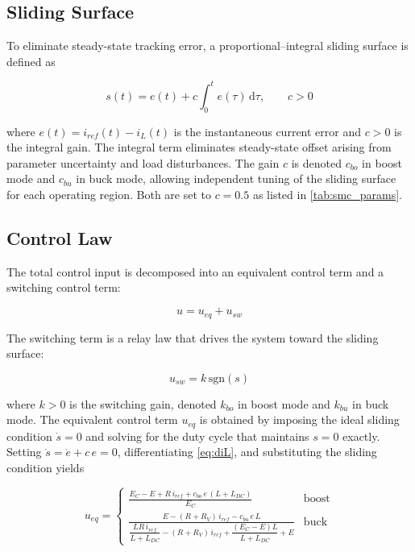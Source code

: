 \subsection{Sliding Surface}
\label{subsec:sliding_surface}

To eliminate steady-state tracking error, a proportional--integral
sliding surface is defined as

\begin{equation}
    s(t) = e(t) + c\int_0^t e(\tau)\,\mathrm{d}\tau, \qquad c > 0
    \label{eq:sliding_surface}
\end{equation}

where $e(t) = i_{ref}(t) - i_L(t)$ is the instantaneous current error
and $c > 0$ is the integral gain. The integral term eliminates
steady-state offset arising from parameter uncertainty and load
disturbances. The gain $c$ is denoted $c_{bo}$ in boost mode and
$c_{bu}$ in buck mode, allowing independent tuning of the sliding
surface for each operating region. Both are set to $c = 0.5$ as
listed in \cref{tab:smc_params}.

\subsection{Control Law}
\label{subsec:control_law}

The total control input is decomposed into an equivalent control term
and a switching control term:

\begin{equation}
    u = u_{eq} + u_{sw}
    \label{eq:control_law}
\end{equation}

The switching term is a relay law that drives the system toward the
sliding surface:

\begin{equation}
    u_{sw} = k\,\mathrm{sgn}(s)
    \label{eq:usw}
\end{equation}

where $k > 0$ is the switching gain, denoted $k_{bo}$ in boost mode
and $k_{bu}$ in buck mode. The equivalent control term $u_{eq}$
is obtained by imposing the ideal sliding condition $\dot{s} = 0$ and
solving for the duty cycle that maintains $s = 0$ exactly. Setting
$\dot{s} = \dot{e} + c\,e = 0$, differentiating \cref{eq:diL}, and
substituting the sliding condition yields

\begin{equation}
    u_{eq} =
    \begin{cases}
        \displaystyle
        \frac{E_C - E + R\,i_{ref} + c_{bo}\,e\,(L+L_{DC})}{E_C}
        & \text{boost}\\[10pt]
        \displaystyle
        \frac{E - (R+R_V)\,i_{ref} - c_{bu}\,e\,L}
        {\dfrac{LR\,i_{ref}}{L+L_{DC}}
         - (R+R_V)\,i_{ref}
         + \dfrac{(E_C-E)L}{L+L_{DC}} + E}
        & \text{buck}
    \end{cases}
    \label{eq:ueq}
\end{equation}

